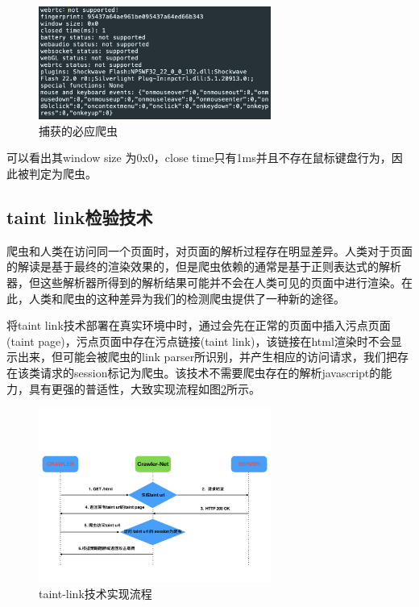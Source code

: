 \documentclass[doctor,privacy,twoside]{buaa_mac}
\begin{document}
\centerline{}
\begin{figure}[!h]
  \centering
  \includegraphics[width=0.68\textwidth]{images/bing_crawler.png}
  \caption{捕获的必应爬虫}
  \label{fig:bing}
\end{figure}
\centerline{}

可以看出其window size 为0x0，close time只有1ms并且不存在鼠标键盘行为，因此被判定为爬虫。


\subsection{taint link检验技术}
爬虫和人类在访问同一个页面时，对页面的解析过程存在明显差异。人类对于页面的解读是基于最终的渲染效果的，但是爬虫依赖的通常是基于正则表达式的解析器，但这些解析器所得到的解析结果可能并不会在人类可见的页面中进行渲染。在此，人类和爬虫的这种差异为我们的检测爬虫提供了一种新的途径。

将taint link技术部署在真实环境中时，通过会先在正常的页面中插入污点页面(taint page)，污点页面中存在污点链接(taint link)，该链接在html渲染时不会显示出来，但可能会被爬虫的link parser所识别，并产生相应的访问请求，我们把存在该类请求的session标记为爬虫。该技术不需要爬虫存在的解析javascript的能力，具有更强的普适性，大致实现流程如图\ref{fig:taint}所示。


\begin{figure}[!h]
  \centering
  \includegraphics[width=0.68\textwidth]{images/taint_link.png}
  \caption{taint-link技术实现流程}
  \label{fig:taint}
\end{figure}
\centerline{}
\end{document}
